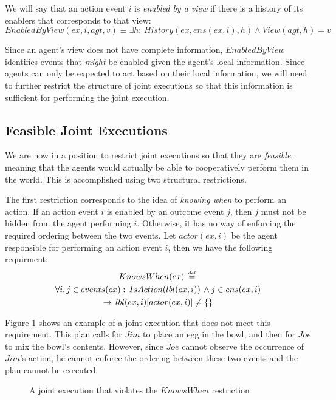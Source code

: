 We will say that an action event $i$ is \emph{enabled by a view}
if there is a history of its enablers that corresponds to that view:
\[
EnabledByView(ex,i,agt,v)\equiv\exists h:\, History(ex,ens(ex,i),h)\wedge View(agt,h)=v\]


Since an agent's view does not have complete information, $EnabledByView$
identifies events that \emph{might} be enabled given the agent's local
information. Since agents can only be expected to act based on their
local information, we will need to further restrict the structure
of joint executions so that this information is sufficient for performing
the joint execution.


\subsection{Feasible Joint Executions}

We are now in a position to restrict joint executions so that they
are \emph{feasible}, meaning that the agents would actually be able
to cooperatively perform them in the world. This is accomplished using
two structural restrictions.

The first restriction corresponds to the idea of \emph{knowing when}
to perform an action. If an action event $i$ is enabled by an outcome
event $j$, then $j$ must not be hidden from the agent performing
$i$. Otherwise, it has no way of enforcing the required ordering
between the two events. Let $actor(ex,i)$ be the agent responsible
for performing an action event $i$, then we have the following requirment:\begin{multline*}
KnowsWhen(ex)\,\stackrel{\mbox{\tiny def}}{=}\,\\
\forall i,j\in events(ex):\, IsAction(lbl(ex,i))\,\wedge j\in ens(ex,i)\\
\rightarrow\, lbl(ex,i)[actor(ex,i)]\neq\{\}\end{multline*}


Figure \ref{fig:not-knows-when} shows an example of a joint execution
that does not meet this requirement. This plan calls for $Jim$ to
place an egg in the bowl, and then for $Joe$ to mix the bowl's contents.
However, since $Joe$ cannot observe the occurrence of $Jim$'s action,
he cannot enforce the ordering between these two events and the plan
cannot be executed.

%
\begin{figure}[!b]

\caption{A joint execution that violates the $KnowsWhen$ restriction}


\label{fig:not-knows-when} 
\end{figure}


